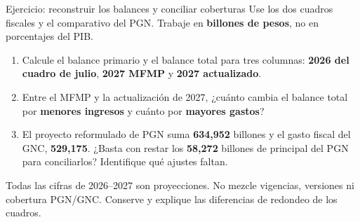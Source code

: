 \begin{frame}{Ejercicio: reconstruir los balances y conciliar coberturas}
\small
Use los dos cuadros fiscales y el comparativo del PGN. Trabaje en \textbf{billones de pesos}, no en porcentajes del PIB.
\vspace{0.25cm}
\begin{enumerate}
\item Calcule el balance primario y el balance total para tres columnas: \textbf{2026 del cuadro de julio}, \textbf{2027 MFMP} y \textbf{2027 actualizado}.
\vspace{0.25cm}
\item Entre el MFMP y la actualización de 2027, ¿cuánto cambia el balance total por \textbf{menores ingresos} y cuánto por \textbf{mayores gastos}?
\vspace{0.25cm}
\item El proyecto reformulado de PGN suma \textbf{634,952} billones y el gasto fiscal del GNC, \textbf{529,175}. ¿Basta con restar los \textbf{58,272} billones de principal del PGN para conciliarlos? Identifique qué ajustes faltan.
\end{enumerate}
\vfill
\scriptsize Todas las cifras de 2026--2027 son proyecciones. No mezcle vigencias, versiones ni cobertura PGN/GNC. Conserve y explique las diferencias de redondeo de los cuadros.
\end{frame}

